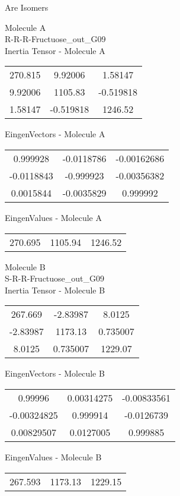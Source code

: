 \begin{center}
\vtab
\vtab
\textcolor{NavyBlue}{\Large Are Isomers}
\end{center}
\newpage
\begin{multicols}{2}
\begin{center}
Molecule A \\ 
R-R-R-Fructuose\_out\_G09
\\
Inertia Tensor - Molecule A \\
\vtab
\begin{tabular}{|c c c|}
270.815	 & 	9.92006	 & 	1.58147	 \\
9.92006	 & 	1105.83	 & 	-0.519818	 \\
1.58147	 & 	-0.519818	 & 	1246.52
\end{tabular}

\vtab
 EingenVectors - Molecule A     \\
\vtab
\begin{tabular}{|c c c|}
0.999928	 & 	-0.0118786	 & 	-0.00162686	 \\
-0.0118843	 & 	-0.999923	 & 	-0.00356382	 \\
0.0015844	 & 	-0.0035829	 & 	0.999992
\end{tabular}

\vtab
 EingenValues - Molecule A     \\
\vtab
\begin{tabular}{|c c c|}
270.695	 & 	1105.94	 & 	1246.52
\end{tabular}
\columnbreak

Molecule B \\ 
S-R-R-Fructuose\_out\_G09
\\
Inertia Tensor - Molecule B \\
\vtab
\begin{tabular}{|c c c|}
267.669	 & 	-2.83987	 & 	8.0125	 \\
-2.83987	 & 	1173.13	 & 	0.735007	 \\
8.0125	 & 	0.735007	 & 	1229.07
\end{tabular}

\vtab
 EingenVectors - Molecule B     \\
\vtab
\begin{tabular}{|c c c|}
0.99996	 & 	0.00314275	 & 	-0.00833561	 \\
-0.00324825	 & 	0.999914	 & 	-0.0126739	 \\
0.00829507	 & 	0.0127005	 & 	0.999885
\end{tabular}

\vtab
 EingenValues - Molecule B     \\
\vtab
\begin{tabular}{|c c c|}
267.593	 & 	1173.13	 & 	1229.15
\end{tabular}

\end{center}
\end{multicols}
